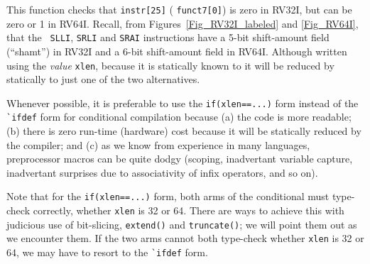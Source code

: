 
This function checks that \verb|instr[25]| ({\ie} {\tt funct7[0]}) is
zero in RV32I, but can be zero or 1 in RV64I.  Recall, from
Figures~\ref{Fig_RV32I_labeled} and \ref{Fig_RV64I}, that the {\tt
SLLI}, {\tt SRLI} and {\tt SRAI} instructions have a 5-bit
shift-amount field (``shamt'') in RV32I and a 6-bit shift-amount field
in RV64I.  Although written using the \emph{value} {\tt xlen}, because
it is statically known to {\bsc} it will be reduced by {\bsc}
statically to just one of the two alternatives.

Whenever possible, it is preferable to use the \verb|if(xlen==...)|
form instead of the \verb|`ifdef| form for conditional compilation
because (a) the code is more readable; (b) there is zero run-time
(hardware) cost because it will be statically reduced by the compiler;
and (c) as we know from experience in many languages, preprocessor
macros can be quite dodgy (scoping, inadvertant variable capture,
inadvertant surprises due to associativity of infix operators, and so
on).

Note that for the \verb|if(xlen==...)| form, both arms of the
conditional must type-check correctly, whether \verb|xlen| is 32 or
64.  There are ways to achieve this with judicious use of bit-slicing,
\verb|extend()| and \verb|truncate()|; we will point them out as we
encounter them.  If the two arms cannot both type-check whether
\verb|xlen| is 32 or 64, we may have to resort to the \verb|`ifdef|
form.

